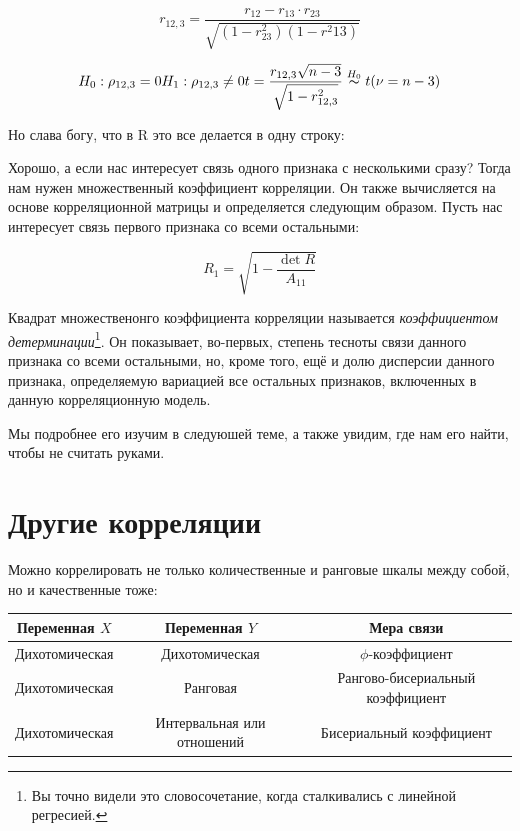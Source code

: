 \documentclass[
  letterpaper,
  DIV=11,
  numbers=noendperiod]{scrreprt}
\theoremstyle{definition}
\theoremstyle{remark}
\begin{document}
\[
r_{12,3} = \frac{r_{12} - r_{13} \cdot r_{23}}{\sqrt{(1 - r^2_{23})(1-r^2{13})}}
\]

\[
H_0: \rho_{12,3} = 0 \\
H_1: \rho_{12,3} \neq 0 \\
t = \frac{r_{12,3} \sqrt{n-3}}{\sqrt{1 - r^2_{12,3}}} \overset{H_0}{\thicksim} t(\nu = n-3)
\]

Но слава богу, что в R это все делается в одну строку:

Хорошо, а если нас интересует связь одного признака с несколькими сразу?
Тогда нам нужен множественный коэффициент корреляции. Он также
вычисляется на основе корреляционной матрицы и определяется следующим
образом. Пусть нас интересует связь первого признака со всеми
остальными:

\[
R_1 = \sqrt{1 - \frac{\det R}{A_{11}}}
\]

Квадрат множественонго коэффициента корреляции называется
\emph{коэффициентом детерминации}\footnote{Вы точно видели это
  словосочетание, когда сталкивались с линейной регресией.}. Он
показывает, во-первых, степень тесноты связи данного признака со всеми
остальными, но, кроме того, ещё и долю дисперсии данного признака,
определяемую вариацией все остальных признаков, включенных в данную
корреляционную модель.

Мы подробнее его изучим в следуюшей теме, а также увидим, где нам его
найти, чтобы не считать руками.

\section{Другие
корреляции}\label{ux434ux440ux443ux433ux438ux435-ux43aux43eux440ux440ux435ux43bux44fux446ux438ux438}

Можно коррелировать не только количественные и ранговые шкалы между
собой, но и качественные тоже:

\begin{longtable}[]{@{}ccc@{}}
\toprule\noalign{}
Переменная \(X\) & Переменная \(Y\) & Мера связи \\
\midrule\noalign{}
\endhead
\bottomrule\noalign{}
\endlastfoot
Дихотомическая & Дихотомическая & \(\phi\)-коэффициент \\
Дихотомическая & Ранговая & Рангово-бисериальный коэффициент \\
Дихотомическая & Интервальная или отношений & Бисериальный
коэффициент \\
\end{longtable}
\end{document}
